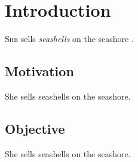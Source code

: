 \chapter{Introduction}

\textsc{She} sells \emph{seashells} on the seashore \cite{goodfellow2016}.

\section{Motivation}

She sells seashells on the seashore.

\section{Objective}

She sells seashells on the seashore.
